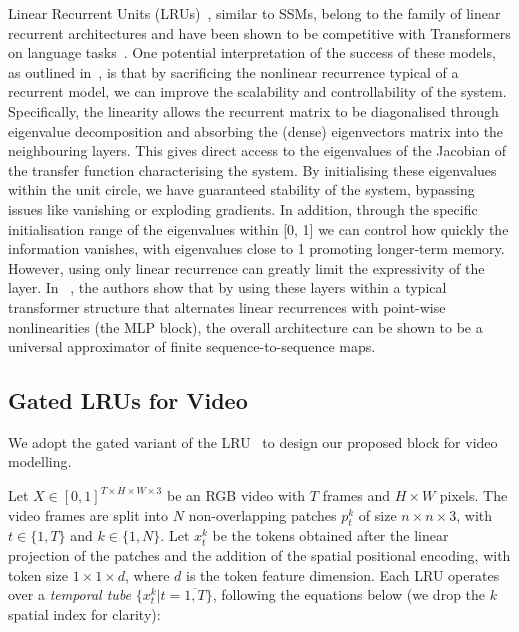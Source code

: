 Linear Recurrent Units (LRUs)~\citep{orvieto2023resurrecting}, similar to SSMs, belong to the family of linear recurrent architectures and have been shown to be competitive with Transformers on language tasks~\citep{de2024griffinmixinggatedlinear,gu2023mamba}. One potential interpretation of the success of these models, as outlined in~\citep{orvieto2023resurrecting}, is that by sacrificing the nonlinear recurrence typical of a recurrent model, we can improve the scalability and controllability of the system. Specifically, the linearity allows the recurrent matrix to be diagonalised through eigenvalue decomposition and absorbing the (dense) eigenvectors matrix into the neighbouring layers. This gives direct access to the eigenvalues of the Jacobian of the transfer function characterising the system. By initialising these eigenvalues within the unit circle, we have guaranteed stability of the system, bypassing issues like vanishing or exploding gradients. In addition, through the specific initialisation range of the eigenvalues within [0, 1] we can control how quickly the information vanishes, with eigenvalues close to 1 promoting longer-term memory. However, using only linear recurrence can greatly limit the expressivity of the layer. In ~\cite{orvieto2023universality}, the authors show that by using these layers within a typical transformer structure that alternates linear recurrences with point-wise nonlinearities (\eg the MLP block), the overall architecture can be shown to be a universal approximator of finite sequence-to-sequence maps.     

\subsection{Gated LRUs for Video}
We adopt the gated variant of the LRU~\citep{de2024griffinmixinggatedlinear} to design our proposed block for video modelling. 

Let $X\in[0, 1]^{T \times H \times W \times 3}$ be an RGB video with $T$ frames and $H \times W$ pixels. The video frames are split into $N$ non-overlapping patches $p_t^k$ of size $n\times n \times 3$, with $t\in\{1,T\}$ and $k\in\{1, N\}$. Let $x_t^k$ be the tokens obtained after the linear projection of the patches and the addition of the spatial positional encoding, with token size $1\times 1 \times d$, where $d$ is the token feature dimension. Each LRU operates over a \textit{temporal tube} $\{x_t^k|t=\overline{1,T}\}$, following the equations below (we drop the $k$ spatial index for clarity):    


